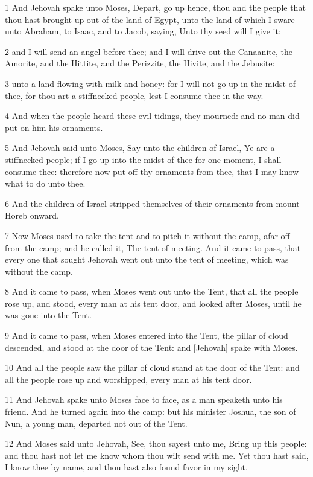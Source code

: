 \par 1 And Jehovah spake unto Moses, Depart, go up hence, thou and the people that thou hast brought up out of the land of Egypt, unto the land of which I sware unto Abraham, to Isaac, and to Jacob, saying, Unto thy seed will I give it:
\par 2 and I will send an angel before thee; and I will drive out the Canaanite, the Amorite, and the Hittite, and the Perizzite, the Hivite, and the Jebusite:
\par 3 unto a land flowing with milk and honey: for I will not go up in the midst of thee, for thou art a stiffnecked people, lest I consume thee in the way.
\par 4 And when the people heard these evil tidings, they mourned: and no man did put on him his ornaments.
\par 5 And Jehovah said unto Moses, Say unto the children of Israel, Ye are a stiffnecked people; if I go up into the midst of thee for one moment, I shall consume thee: therefore now put off thy ornaments from thee, that I may know what to do unto thee.
\par 6 And the children of Israel stripped themselves of their ornaments from mount Horeb onward.
\par 7 Now Moses used to take the tent and to pitch it without the camp, afar off from the camp; and he called it, The tent of meeting. And it came to pass, that every one that sought Jehovah went out unto the tent of meeting, which was without the camp.
\par 8 And it came to pass, when Moses went out unto the Tent, that all the people rose up, and stood, every man at his tent door, and looked after Moses, until he was gone into the Tent.
\par 9 And it came to pass, when Moses entered into the Tent, the pillar of cloud descended, and stood at the door of the Tent: and [Jehovah] spake with Moses.
\par 10 And all the people saw the pillar of cloud stand at the door of the Tent: and all the people rose up and worshipped, every man at his tent door.
\par 11 And Jehovah spake unto Moses face to face, as a man speaketh unto his friend. And he turned again into the camp: but his minister Joshua, the son of Nun, a young man, departed not out of the Tent.
\par 12 And Moses said unto Jehovah, See, thou sayest unto me, Bring up this people: and thou hast not let me know whom thou wilt send with me. Yet thou hast said, I know thee by name, and thou hast also found favor in my sight.
